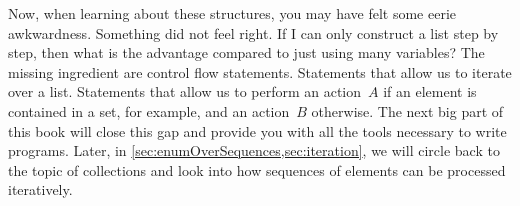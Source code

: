 Now, when learning about these structures, you may have felt some eerie awkwardness.
Something did not feel right.
If I can only construct a list step by step, then what is the advantage compared to just using many variables?
The missing ingredient are control flow statements.
Statements that allow us to iterate over a list.
Statements that allow us to perform an action~$A$ if an element is contained in a set, for example, and an action~$B$ otherwise.
The next big part of this book will close this gap and provide you with all the tools necessary to write  programs.
Later, in \cref{sec:enumOverSequences,sec:iteration}, we will circle back to the topic of collections and look into how sequences of elements can be processed iteratively.%
%
\endhsection%
%
